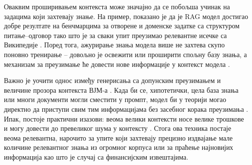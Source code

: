 Оваквим проширивањем контекста може значајно да се побољша учинак на задацима који захтевају знање. На пример, показано је да је RAG модел достигао добре резултате на бенчмарцима за отворене и доменске задатке са структуром питање--одговор тако што је за сваки упит преузимао релевантне исечке са Википедије \cite{lewis_retrieval_2020,yang_dual_2025}. Поред тога, ажурирање знања модела више не захтева скупо поновно тренирање -- довољно је освежити или проширити спољну базу знања, а механизам за преузимање ће довести нове информације у контекст модела \cite{lewis_retrieval_2020}.

Важно је уочити однос између генерисања са допунским преузимањем и величине прозора контекста ВЈМ-а \cite{kim_large_2024}. Када би се, хипотетички, цела база знања или многи документи могли сместити у промпт, модел би у теорији могао директно да приступи свим тим информацијама без засебног корака преузимања \cite{kim_large_2024}. Ипак, постоје практични изазови: веома велики контексти носе велике трошкове и могу довести до превеликог шума у контексту \cite{liu_lost_2023,kim_large_2024}. Стога ова техника постаје веома релевантна, нарочито за упите који захтевају прецизно издвајање мале количине релевантног знања из огромног корпуса или за праћење најновијих информација као што је случај са финансијским извештајима.